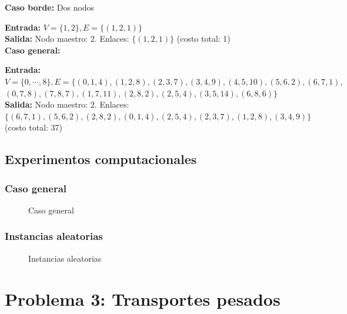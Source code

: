 \documentclass[a4paper, 10pt, twoside]{article}
\newcommand{\dosgraficos}[2]{
    \newcommand{\separacion}{-2.2em}
    \vspace{\separacion}
    
    \vspace{\separacion}
    
}
\begin{document}
\textbf{Caso borde:} Dos nodos

\textbf{Entrada:} $V = \{ 1, 2 \}, E = \{ (1, 2, 1) \}$\\
\textbf{Salida:} Nodo maestro: $2$. Enlaces: $\{ (1, 2, 1) \}$ (costo total: 1)
\\

\textbf{Caso general:}

\textbf{Entrada:} $V = \{ 0, \cdots, 8 \}, E = \{ (0, 1, 4), (1, 2, 8), (2, 3, 7), (3, 4, 9), (4, 5, 10), (5, 6, 2), (6, 7, 1),$\\
$(0, 7, 8), (7, 8, 7), (1, 7, 11), (2, 8, 2), (2, 5, 4), (3, 5, 14), (6, 8, 6) \}$\\
\textbf{Salida:} Nodo maestro: $2$. Enlaces: $\{ (6, 7, 1), (5, 6, 2), (2, 8, 2), (0, 1, 4), (2, 5, 4), (2, 3, 7), (1, 2, 8), (3, 4, 9) \}$ (costo total: 37)


\subsection{Experimentos computacionales}

\subsubsection{Caso general}

\begin{figure}[H]
  \centering
  \dosgraficos{problema2-caso-general}
              {problema2-caso-general-n}
  \caption{Caso general}
\end{figure}


\subsubsection{Instancias aleatorias}

\begin{figure}[H]
  \centering
  \dosgraficos{problema2-instancias-aleatorias}
              {problema2-instancias-aleatorias-n}
  \caption{Instancias aleatorias}
\end{figure}

\newpage




\section{Problema 3: Transportes pesados}
\end{document}
